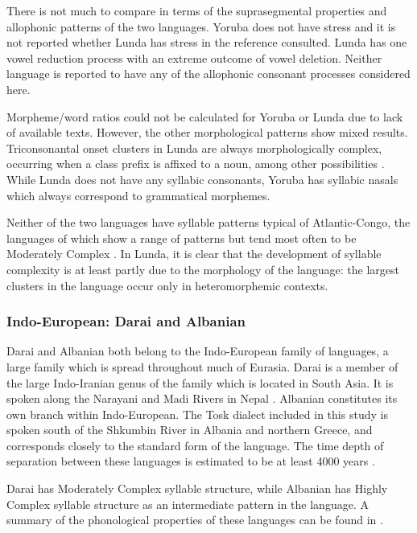   There is not much to compare in terms of the suprasegmental properties and allophonic patterns of the two languages. Yoruba does not have stress and it is not reported whether Lunda has stress in the reference consulted. Lunda has one vowel reduction process with an extreme outcome of vowel deletion. Neither language is reported to have any of the allophonic consonant processes considered here.

  Morpheme/word ratios could not be calculated for Yoruba or Lunda due to lack of available texts. However, the other morphological patterns show mixed results. Triconsonantal onset clusters in Lunda are always morphologically complex, occurring when a class prefix is affixed to a noun, among other possibilities \citep[23--24]{Kawasha2003}. While Lunda does not have any syllabic consonants, Yoruba has syllabic nasals which always correspond to grammatical morphemes.

  Neither of the two languages have syllable patterns typical of Atlantic-Congo, the languages of which show a range of patterns but tend most often to be Moderately Complex \citep{Maddieson2013a}. In Lunda, it is clear that the development of syllable complexity is at least partly due to the morphology of the language: the largest clusters in the language occur only in heteromorphemic contexts.

\subsubsection{{Indo-European:} {Darai} {and} {Albanian}}\label{sec:8.4.3.5}

  Darai and Albanian both belong to the Indo-European family of languages, a large family which is spread throughout much of Eurasia. Darai is a member of the large Indo-Iranian genus of the family which is located in South Asia. It is spoken along the Narayani and Madi Rivers in Nepal \citep{Dhakal2012}. Albanian constitutes its own branch within Indo-European. The Tosk dialect included in this study is spoken south of the Shkumbin River in Albania and northern Greece, and corresponds closely to the standard form of the language. The time depth of separation between these languages is estimated to be at least 4000 years \citep[146]{Garrett2006}.

  Darai has Moderately Complex syllable structure, while Albanian has Highly Complex syllable structure as an intermediate pattern in the language. A summary of the phonological properties of these languages can be found in .

